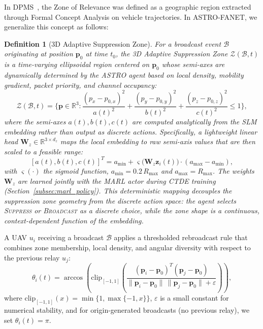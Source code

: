 \documentclass[5p,times]{elsarticle}
\newtheorem{definition}{Definition}[section]
\begin{document}
In DPMS~\cite{allani2018dpms}, the Zone of Relevance was defined as a geographic region extracted through Formal Concept Analysis on vehicle trajectories. In ASTRO-FANET, we generalize this concept as follows:

\begin{definition}[3D Adaptive Suppression Zone]
\label{def:a3d_zone}
For a broadcast event $\mathcal{B}$ originating at position $\mathbf{p}_0$ at time $t_0$, the 3D Adaptive Suppression Zone $\mathcal{Z}(\mathcal{B}, t)$ is a time-varying ellipsoidal region centered on $\mathbf{p}_0$ whose semi-axes are dynamically determined by the ASTRO agent based on local density, mobility gradient, packet priority, and channel occupancy:
\begin{equation}
\label{eq:a3d_zone}
\mathcal{Z}(\mathcal{B}, t) = \Big\{\mathbf{p} \in \mathbb{R}^3 : \frac{(p_x - p_{0,x})^2}{a(t)^2} + \frac{(p_y - p_{0,y})^2}{b(t)^2} + \frac{(p_z - p_{0,z})^2}{c(t)^2} \leq 1\Big\},
\end{equation}
where the semi-axes $a(t), b(t), c(t)$ are computed analytically from the SLM embedding rather than output as discrete actions. Specifically, a lightweight linear head $\mathbf{W}_z \in \mathbb{R}^{3 \times d_z}$ maps the local embedding to raw semi-axis values that are then scaled to a feasible range:
\begin{equation}
\label{eq:semiaxes}
[a(t), b(t), c(t)]^T = a_{\min} + \varsigma\big(\mathbf{W}_z \mathbf{z}_i(t)\big) \cdot (a_{\max} - a_{\min}),
\end{equation}
with $\varsigma(\cdot)$ the sigmoid function, $a_{\min} = 0.2\,R_{\max}$ and $a_{\max} = R_{\max}$. The weights $\mathbf{W}_z$ are learned jointly with the MARL actor during CTDE training (Section~\ref{subsec:marl_policy}). This deterministic mapping decouples the suppression zone geometry from the discrete action space: the agent selects \textsc{Suppress} or \textsc{Broadcast} as a discrete choice, while the zone shape is a continuous, context-dependent function of the embedding.
\end{definition}

A UAV $u_i$ receiving a broadcast $\mathcal{B}$ applies a thresholded rebroadcast rule that combines zone membership, local density, and angular diversity with respect to the previous relay $u_j$:
\begin{equation}
\label{eq:theta_def}
\theta_i(t)=\arccos\!\left(\mathrm{clip}_{[-1,1]}\!\left(\frac{(\mathbf{p}_i-\mathbf{p}_0)^T(\mathbf{p}_{j}-\mathbf{p}_0)}{\lVert\mathbf{p}_i-\mathbf{p}_0\rVert\,\lVert\mathbf{p}_{j}-\mathbf{p}_0\rVert+\varepsilon}\right)\right),
\end{equation}
where $\mathrm{clip}_{[-1,1]}(x)=\min\{1,\max\{-1,x\}\}$, $\varepsilon$ is a small constant for numerical stability, and for origin-generated broadcasts (no previous relay), we set $\theta_i(t)=\pi$.
\end{document}
